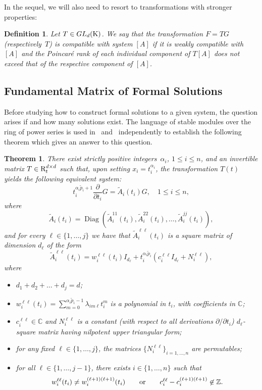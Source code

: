 \documentclass[final,1p,times,number,amsthm]{elsart}
\newtheorem{theorem}[lemma]{Theorem}
\newtheorem{definition}[lemma]{Definition}
\newcommand{\pder}[2]{\frac{\partial}{\partial #2}#1}
\begin{document}
In the sequel, we will also need to resort to transformations with stronger
properties:
 \begin{definition}
\label{compatible}
Let $T\in GL_d({\rm K})$. We say that the transformation $F= TG$
(respectively~$T$) is \textit{compatible} with system $[A]$ if it is weakly
compatible with $[A]$ and the Poincar\'{e} rank of each individual component of
$T[A]$ does not exceed that of the respective component of $[A]$.
\end{definition}
\subsection{Fundamental Matrix of Formal Solutions}
Before studying how to construct formal solutions to a given system, the
question arises if and how many solutions exist. The language of stable modules
over the ring of power series is used in~\cite[Theorem 1]{key53} and~\cite[Main
Theorem]{key4} independently to establish the following theorem which gives an
answer to this question.

\begin{theorem}
  \label{gerardexistence}
  There exist strictly positive integers~$\alpha_i$, $1 \leq i \leq n$, and an
  invertible matrix $T \in {\rm R}^{d\times d}_t$ such that, upon setting
  $x_i = t_i^{\alpha_i}$, the transformation $T(t)$ yields the following
  equivalent system:
  \[
    t_i^{\alpha_i \tilde{p}_i+1} \pder{G}{t_i}= \tilde{A}_{i}(t_i) G, \quad 1 \leq
  i \leq n,\]
 where
 \[ \tilde{A}_{i}(t_i) = \operatorname{Diag} (\tilde{A}^{11}_{i}(t_i),
   \tilde{A}^{22}_{i}(t_i), \dots, \tilde{A}^{jj}_{i}(t_i)) ,\]
 and for every $\ell \in \{ 1, \dots, j\}$ we have that
 $\tilde{A}^{\ell \ell}_i(t_i) $ is a square matrix of dimension $d_\ell$ of the
 form
  \[ \tilde{A}^{ \ell \ell}_{i}(t_i) = w^{ \ell \ell}_{i} (t_i) I_{d_\ell} +
    t_i^{\alpha_i \tilde{p}_i}( c^{ \ell \ell}_{i}  I_{d_\ell} + N^{ \ell \ell}_{i}),\]
where
\begin{itemize}
\item $d_1 + d_2 + \dots + d_j = d$;
\item
  $w^{ \ell \ell}_{i} (t_i) = \sum_{m=0}^{\alpha_i \tilde{p}_i -1} \lambda_{im \ell}
  t_i^{m}$ is a polynomial in $t_i$, with coefficients in
  $\mathbb{C}$;
\item $c^{ \ell \ell}_{i} \in \mathbb{C}$ and $N^{ \ell \ell}_{i}$ is a constant
  (with respect to all derivations $\partial/\partial t_i$) $d_\ell$-square
  matrix having nilpotent upper triangular form;
\item for any fixed $\ell \in \{ 1, \dots, j \}$, the matrices
  ${\{ N^{ \ell \ell}_{i}\}}_{i = 1, \dots, n}$ are permutables;
\item for all $\ell \in \{ 1, \dots, j-1 \}$, there exists
  $i \in \{ 1, \dots, n\}$ such that
 \[ w^{ \ell \ell}_{i} (t_i) \neq w^{(\ell+1)(\ell+1)}_{i}
    (t_i) \text{\qquad or\qquad}  c^{ \ell \ell}_{i} - c^{(\ell+1)(\ell+1)}_{i} \not
    \in \mathbb{Z}.\]
\end{itemize}
\end{theorem}
\end{document}
